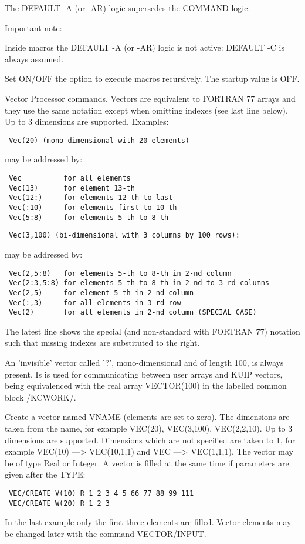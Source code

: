 The DEFAULT -A (or -AR) logic supersedes the COMMAND logic.

Important note:

Inside macros the DEFAULT -A (or -AR) logic is not active:
DEFAULT -C is always assumed.
\ENDTEXT

\BEGARG
{}
\ENDARG
\BEGTEXT
Set ON/OFF the option to execute macros recursively.
The startup value is OFF.
\ENDTEXT


\BEGTEXT
Vector Processor commands.
Vectors are equivalent to FORTRAN 77 arrays and they use
the same notation except when omitting indexes (see last line below).
Up to 3 dimensions are supported. Examples:
\begin{verbatim}
 Vec(20) (mono-dimensional with 20 elements)
\end{verbatim}
may be addressed by:
\begin{verbatim}
 Vec          for all elements
 Vec(13)      for element 13-th
 Vec(12:)     for elements 12-th to last
 Vec(:10)     for elements first to 10-th
 Vec(5:8)     for elements 5-th to 8-th
\end{verbatim}

\begin{verbatim}
 Vec(3,100) (bi-dimensional with 3 columns by 100 rows):
\end{verbatim}
may be addressed by:
\begin{verbatim}
 Vec(2,5:8)   for elements 5-th to 8-th in 2-nd column
 Vec(2:3,5:8) for elements 5-th to 8-th in 2-nd to 3-rd columns
 Vec(2,5)     for element 5-th in 2-nd column
 Vec(:,3)     for all elements in 3-rd row
 Vec(2)       for all elements in 2-nd column (SPECIAL CASE)
\end{verbatim}
The latest line shows the special (and non-standard with FORTRAN 77)
notation such that missing indexes are substituted to the right.

An 'invisible' vector called '?', mono-dimensional and of length 100,
is always present. Is is used for communicating between user arrays
and KUIP vectors, being equivalenced with the real array VECTOR(100)
in the labelled common block /KCWORK/.
\ENDTEXT

\BEGARG
{}
\ENDARG
\BEGTEXT
Create a vector named VNAME (elements are set to zero).
The dimensions are taken from the name,
for example VEC(20), VEC(3,100), VEC(2,2,10).
Up to 3 dimensions are supported. Dimensions which are not specified
are taken to 1, for example VEC(10) ---> VEC(10,1,1) and VEC ---> VEC(1,1,1).
The vector may be of type Real or Integer.
A vector is filled at the same time if parameters are given
after the TYPE:
\begin{verbatim}
 VEC/CREATE V(10) R 1 2 3 4 5 66 77 88 99 111
 VEC/CREATE W(20) R 1 2 3
\end{verbatim}
In the last example only the first three elements are filled.
Vector elements may be changed later with the command VECTOR/INPUT.

